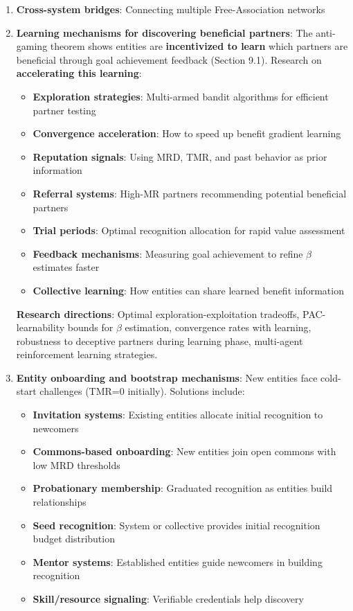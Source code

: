 \documentclass[11pt,a4paper]{article}
\theoremstyle{definition}
\theoremstyle{remark}
\begin{document}
\begin{enumerate}
\item \textbf{Cross-system bridges}: Connecting multiple Free-Association networks

\item \textbf{Learning mechanisms for discovering beneficial partners}: The anti-gaming theorem shows entities are \textbf{incentivized to learn} which partners are beneficial through goal achievement feedback (Section 9.1). Research on \textbf{accelerating this learning}:
\begin{itemize}
\item \textbf{Exploration strategies}: Multi-armed bandit algorithms for efficient partner testing
\item \textbf{Convergence acceleration}: How to speed up benefit gradient learning
\item \textbf{Reputation signals}: Using MRD, TMR, and past behavior as prior information
\item \textbf{Referral systems}: High-MR partners recommending potential beneficial partners
\item \textbf{Trial periods}: Optimal recognition allocation for rapid value assessment
\item \textbf{Feedback mechanisms}: Measuring goal achievement to refine $\beta$ estimates faster
\item \textbf{Collective learning}: How entities can share learned benefit information
\end{itemize}

\textbf{Research directions}: Optimal exploration-exploitation tradeoffs, PAC-learnability bounds for $\beta$ estimation, convergence rates with learning, robustness to deceptive partners during learning phase, multi-agent reinforcement learning strategies.

\item \textbf{Entity onboarding and bootstrap mechanisms}: New entities face cold-start challenges (TMR=0 initially). Solutions include:
\begin{itemize}
\item \textbf{Invitation systems}: Existing entities allocate initial recognition to newcomers
\item \textbf{Commons-based onboarding}: New entities join open commons with low MRD thresholds
\item \textbf{Probationary membership}: Graduated recognition as entities build relationships
\item \textbf{Seed recognition}: System or collective provides initial recognition budget distribution
\item \textbf{Mentor systems}: Established entities guide newcomers in building recognition
\item \textbf{Skill/resource signaling}: Verifiable credentials help discovery
\end{itemize}


\end{enumerate}
\end{document}
